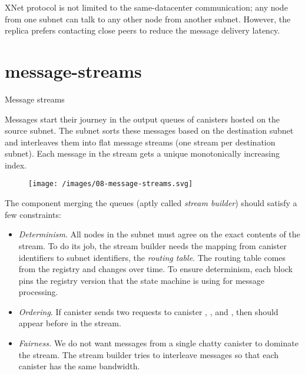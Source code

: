 \documentclass{article}
\begin{document}
XNet protocol is not limited to the same-datacenter communication; any node from one subnet can talk to any other node from another subnet.
However, the replica prefers contacting close peers to reduce the message delivery latency.

\section{message-streams}{Message streams}

Messages start their journey in the output queues of canisters hosted on the source subnet.
The subnet sorts these messages based on the destination subnet and interleaves them into flat message streams (one stream per destination subnet).
Each message in the stream gets a unique monotonically increasing index.

\begin{figure}[grayscale-diagram]
  \texttt{[image: /images/08-message-streams.svg]}
\end{figure}

The component merging the queues (aptly called \emph{stream builder}) should satisfy a few constraints:
\begin{itemize}
  \item
  \emph{Determinism}.
  All nodes in the subnet must agree on the exact contents of the stream.
  To do its job, the stream builder needs the mapping from canister identifiers to subnet identifiers, the \emph{routing table}.
  The routing table comes from the registry and changes over time.
  To ensure determinism, each block pins the registry version that the state machine is using for message processing.
  \item
  \emph{Ordering}.
  If canister  sends two requests to canister , , and , then  should appear before  in the stream.
  \item
  \emph{Fairness.}
  We do not want messages from a single chatty canister to dominate the stream.
  The stream builder tries to interleave messages so that each canister has the same bandwidth.
\end{itemize}
\end{document}
